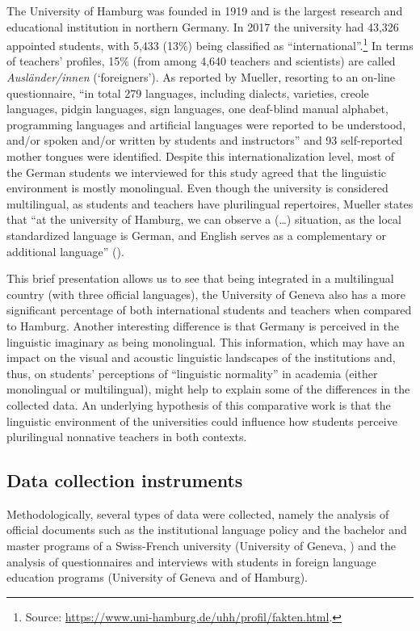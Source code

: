 \documentclass[output=paper]{../langscibook}
\begin{document}
The University of Hamburg was founded in 1919 and is the largest research and educational institution in northern Germany. In 2017 the university had 43,326 appointed students, with 5,433 (13\%) being classified as “international”.\footnote{Source: \url{https://www.uni-hamburg.de/uhh/profil/fakten.html}.}  In terms of teachers’ profiles, 15\% (from among 4,640 teachers and scientists) are called \emph{Ausländer/innen} (`foreigners'). As reported by Mueller, resorting to an on-line questionnaire, “in total 279 languages, including dialects, varieties, creole languages, pidgin languages, sign languages, one deaf-blind manual alphabet, programming languages and artificial languages were reported to be understood, and/or spoken and/or written by students and instructors” \citep[366]{Mueller2018} and 93 self-reported mother tongues were identified. Despite this internationalization level, most of the German students we interviewed for this study agreed that the linguistic environment is mostly monolingual. Even though the university is considered multilingual, as students and teachers have plurilingual repertoires, Mueller states that “at the university of Hamburg, we can observe a (…) situation, as the local standardized language is German, and English serves as a complementary or additional language” (\citeyear[361]{Mueller2018}).

This brief presentation allows us to see that being integrated in a multilingual country (with three official languages), the University of Geneva also has a more significant percentage of both international students and teachers when compared to Hamburg. Another interesting difference is that Germany is perceived in the linguistic imaginary as being monolingual. This information, which may have an impact on the visual and acoustic linguistic landscapes of the institutions and, thus, on students’ perceptions of “linguistic normality” in academia (either monolingual or multilingual), might help to explain some of the differences in the collected data. An underlying hypothesis of this comparative work is that the linguistic environment of the universities could influence how students perceive plurilingual nonnative teachers in both contexts. 

\subsection{Data collection instruments}
Methodologically, several types of data were collected, namely the analysis of official documents such as the institutional language policy and the bachelor and master programs of a Swiss-French university (University of Geneva, \citealt{Yanaprasart2020}) and the analysis of questionnaires and interviews with students in foreign language education programs (University of Geneva and of Hamburg). 
\end{document}
